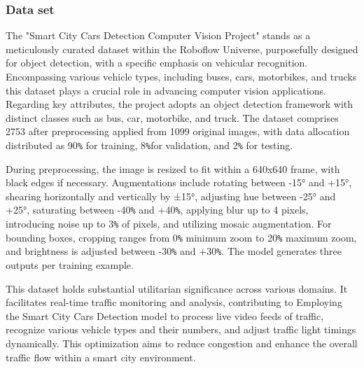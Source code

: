 \subsubsection{Data set}
\label{datset}
The "Smart City Cars Detection Computer Vision Project" stands as a meticulously curated dataset within the Roboflow Universe, purposefully designed for object detection, with a specific emphasis on vehicular recognition. Encompassing various vehicle types, including buses, cars, motorbikes, and trucks this dataset plays a crucial role in advancing computer vision applications.
Regarding key attributes, the project adopts an object detection framework with distinct classes such as bus, car, motorbike, and truck. The dataset comprises 2753 after preprocessing applied from 1099 original images, with data allocation distributed as 90\texttt{\%} for training, 8\texttt{\%}for validation, and 2\texttt{\%} for testing.

During preprocessing, the image is resized to fit within a 640x640 frame, with black edges if necessary. Augmentations include rotating between -15° and +15°, shearing horizontally and vertically by ±15°, adjusting hue between -25° and +25°, saturating between -40\texttt{\%} and +40\texttt{\%}, applying blur up to 4 pixels, introducing noise up to 3\texttt{\%} of pixels, and utilizing mosaic augmentation. For bounding boxes, cropping ranges from 0\texttt{\%} minimum zoom to 20\texttt{\%} maximum zoom, and brightness is adjusted between -30\texttt{\%} and +30\texttt{\%}. The model generates three outputs per training example.

This dataset holds substantial utilitarian significance across various domains. It facilitates real-time traffic monitoring and analysis, contributing to Employing the Smart City Cars Detection model to process live video feeds of traffic, recognize various vehicle types and their numbers, and adjust traffic light timings dynamically. This optimization aims to reduce congestion and enhance the overall traffic flow within a smart city environment.   

